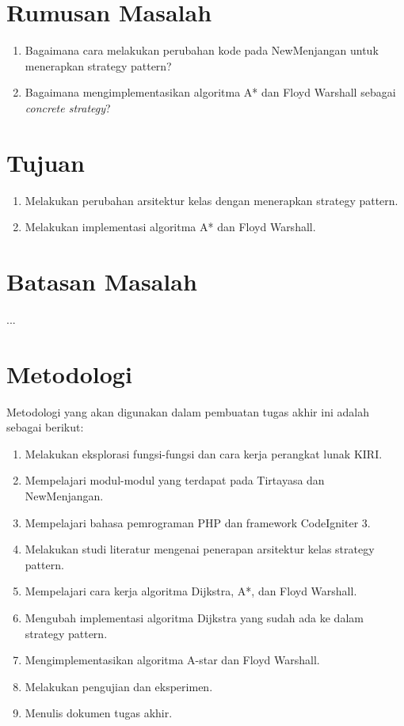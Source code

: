 \section{Rumusan Masalah}
\label{sec:rumusan}
\begin{enumerate}
    \item Bagaimana cara melakukan perubahan kode pada NewMenjangan untuk menerapkan strategy pattern?
    \item Bagaimana mengimplementasikan algoritma A* dan Floyd Warshall sebagai \textit{concrete strategy}?
\end{enumerate}

\section{Tujuan}
\label{sec:tujuan}
\begin{enumerate}
    \item Melakukan perubahan arsitektur kelas dengan menerapkan strategy pattern.
    \item Melakukan implementasi algoritma A* dan Floyd Warshall.
\end{enumerate}

\section{Batasan Masalah}
\label{sec:batasan}
...

\section{Metodologi}
\label{sec:metlit}
Metodologi yang akan digunakan dalam pembuatan tugas akhir ini adalah sebagai berikut:
	\begin{enumerate}
		\item Melakukan eksplorasi fungsi-fungsi dan cara kerja perangkat lunak KIRI.
		\item Mempelajari modul-modul yang terdapat pada Tirtayasa dan NewMenjangan.
		\item Mempelajari bahasa pemrograman PHP dan framework CodeIgniter 3.
		\item Melakukan studi literatur mengenai penerapan arsitektur kelas strategy pattern.
    		\item Mempelajari cara kerja algoritma Dijkstra, A*, dan Floyd Warshall.
    		\item Mengubah implementasi algoritma Dijkstra yang sudah ada ke dalam strategy pattern.
    		\item Mengimplementasikan algoritma A-star dan Floyd Warshall.
    		\item Melakukan pengujian dan eksperimen.
    		\item Menulis dokumen tugas akhir.
	\end{enumerate}


